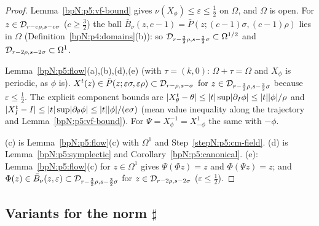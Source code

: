 \begin{proof}
\label{stepN:p5:cm-field} Lemma~\ref{bpN:p5:vf-bound} gives $\nu(X_\phi)\le\varepsilon\le\frac12$ on $\Omega$, and $\Omega$ is open. For $z\in\mathcal D_{r-c\rho,s-c\sigma}$ ($c\ge\frac32$) the ball $\bar B_\nu(z,c-1)=\bar P(z;(c-1)\sigma,(c-1)\rho)$ lies in $\Omega$ (Definition~\ref{bpN:p4:domains}(b)): so $\mathcal D_{r-\frac32\rho,s-\frac32\sigma}\subset\Omega^{1/2}$ and $\mathcal D_{r-2\rho,s-2\sigma}\subset\Omega^1$.

\label{stepN:p5:cm-ab} Lemma~\ref{bpN:p5:flow}(a),(b),(d),(e) (with $\tau=(k,0)$: $\Omega+\tau=\Omega$ and $X_\phi$ is periodic, as $\phi$ is). $X^t(z)\in\bar P(z;\varepsilon\sigma,\varepsilon\rho)\subset\mathcal D_{r-\rho,s-\sigma}$ for $z\in\mathcal D_{r-\frac32\rho,s-\frac32\sigma}$ because $\varepsilon\le\frac12$. The explicit component bounds are $\lvert X^t_\theta-\theta\rvert\le\lvert t\rvert\sup\lvert \partial_I\phi\rvert\le\lvert t\rvert\lvert \phi\rvert/\rho$ and $\lvert X^t_I-I\rvert\le\lvert t\rvert\sup\lvert \partial_\theta\phi\rvert\le\lvert t\rvert\lvert \phi\rvert/(e\sigma)$ (mean value inequality along the trajectory and Lemma~\ref{bpN:p5:vf-bound}). For $\Psi=X^{-1}_\phi=X^1_{-\phi}$ the same with $-\phi$.

\label{stepN:p5:cm-cde} (c) is Lemma~\ref{bpN:p5:flow}(c) with $\Omega^1$ and Step~\ref{stepN:p5:cm-field}. (d) is Lemma~\ref{bpN:p5:symplectic} and Corollary~\ref{bpN:p5:canonical}. (e): Lemma~\ref{bpN:p5:flow}(c) for $z\in\Omega^1$ gives $\Psi(\Phi z)=z$ and $\Phi(\Psi z)=z$; and $\Phi(z)\in\bar B_\nu(z,\varepsilon)\subset\mathcal D_{r-\frac32\rho,s-\frac32\sigma}$ for $z\in\mathcal D_{r-2\rho,s-2\sigma}$ ($\varepsilon\le\frac12$).
\end{proof}

\subsection{Variants for the norm $\sharp$}\label{bpN:p5:s-sharp}

